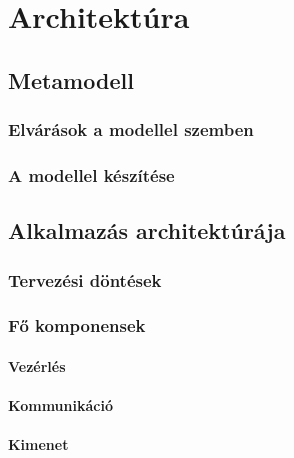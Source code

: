 \chapter{Architektúra}

\section{Metamodell}

%
\subsection{Elvárások a modellel szemben}
%

%
\subsection{A modellel készítése}
%

\section{Alkalmazás architektúrája}

%
\subsection{Tervezési döntések}
%

%
\subsection{Fő komponensek}
%

\subsubsection{Vezérlés}

\subsubsection{Kommunikáció}

\subsubsection{Kimenet}